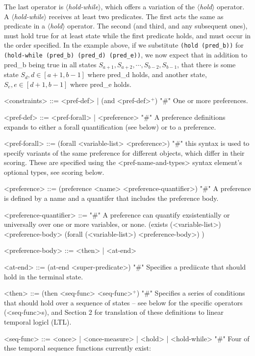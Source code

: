 \documentclass{article}
\newcommand{\dsl}[1]{{\it $\langle$#1$\rangle$}}
\begin{document}
The last operator is \dsl{hold-while}, which offers a variation of the \dsl{hold} operator.
A \dsl{hold-while} receives at least two predicates.
The first acts the same as predicate in a \dsl{hold} operator.
The second (and third, and any subsequent ones), must hold true for at least state while the first predicate holds, and must occur in the order specified.
In the example above, if we substitute \lstinline{(hold (pred_b))} for \lstinline{(hold-while (pred_b) (pred_d) (pred_e))}, we now expect that in addition to pred\_b being true in all states $S_{a+1}, S_{a+2}, \cdots, S_{b-2}, S_{b-1}$, that there is some state $S_d, d \in [a+1, b-1]$ where pred\_d holds, and another state, $S_e, e \in [d+1, b-1]$ where pred\_e holds.

\begin{grammar}
<constraints> ::= <pref-def> | (and <pref-def>$^+$)  "#" One or more preferences.

<pref-def> ::= <pref-forall> | <preference> "#" A preference definitions expands to either a forall quantification (see below) or to a preference.

<pref-forall> ::= (forall <variable-list> <preference>) "#" this syntax is used to specify variants of the same preference for different objects, which differ in their scoring. These are specified using the <pref-name-and-types> syntax element's optional types, see scoring below.

<preference> ::= (preference <name> <preference-quantifier>) "#" A preference is defined by a name and a quantifer that includes the preference body.

<preference-quantifier> ::= "#" A preference can quantify exsistentially or universally over one or more variables, or none.
\alt (exists (<variable-list>) <preference-body>
\alt  (forall (<variable-list>) <preference-body>)
)

<preference-body> ::=  <then> | <at-end>

<at-end> ::= (at-end <super-predicate>) "#" Specifies a prediicate that should hold in the terminal state.

<then> ::= (then <seq-func> <seq-func>$^+$) "#" Specifies a series of conditions that should hold over a sequence of states -- see below for the specific operators (<seq-func>s), and Section 2 for translation of these definitions to linear temporal logicl (LTL).

<seq-func> ::= <once> | <once-measure> | <hold> | <hold-while> "#" Four of thse temporal sequence functions currently exist:


\end{grammar}
\end{document}
